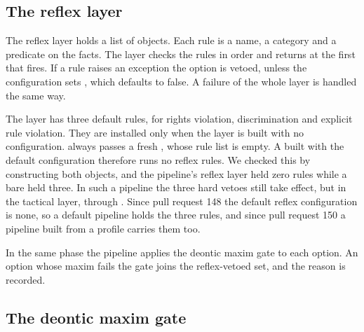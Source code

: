 \subsection{The reflex layer}

The reflex layer holds a list of  objects. Each rule is a name, a category and a
predicate on the facts. The layer checks the rules in order and returns at the first that fires.
If a rule raises an exception the option is vetoed, unless the configuration sets
, which defaults to false. A failure of the whole layer is handled the same way.

The layer has three default rules, for rights violation, discrimination and explicit rule
violation. They are installed only when the layer is built with no configuration.
 always passes a fresh , whose rule list is empty.
A  built with the default configuration therefore runs no reflex rules. We
checked this by constructing both objects, and the pipeline's reflex layer held zero rules while
a bare  held three. In such a pipeline the three hard vetoes still take
effect, but in the tactical layer, through .
Since pull request 148 the default reflex configuration is none, so a default pipeline holds the
three rules, and since pull request 150 a pipeline built from a profile carries them too.

In the same phase the pipeline applies the deontic maxim gate to each option. An option whose
maxim fails the gate joins the reflex-vetoed set, and the reason is recorded.

\subsection{The deontic maxim gate}\label{sec:deme-deontic}

